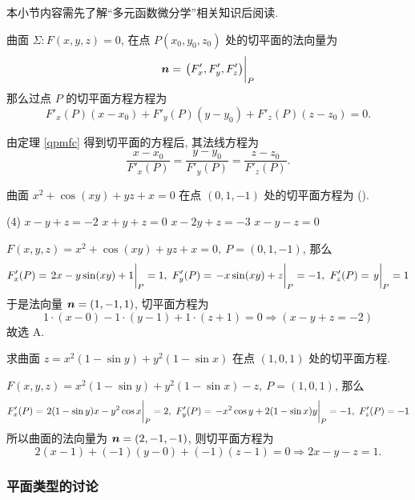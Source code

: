 本小节内容需先了解“多元函数微分学”相关知识后阅读.

\begin{theorem}[切平面方程]
    曲面 $\varSigma:F(x,y,z)=0$, 在点 $P(x_0,y_0,z_0)$ 处的切平面的法向量为
    \label{qpmfc}
    $$\vb*{n}=\eval{\qty(F'_x,F'_y,F'_z)}_{P}$$
    那么过点 $P$ 的切平面方程方程为
    $$F'_x(P)(x-x_0)+F'_y(P)(y-y_0)+F'_z(P)(z-z_0)=0.$$
\end{theorem}

\begin{theorem}[法线方程]
    由定理 \ref{qpmfc} 得到切平面的方程后, 其法线方程为 $$\dfrac{x-x_0}{F'_x(P)}=\dfrac{y-y_0}{F'_y(P)}=\dfrac{z-z_0}{F'_z(P)}.$$
\end{theorem}

\begin{example}[2013 数一]
    曲面 $x^2+\cos(xy)+yz+x=0$ 在点 $(0,1,-1)$ 处的切平面方程为 (\quad).
    \begin{tasks}(4)
        \task $x-y+z=-2$
        \task $x+y+z=0$
        \task $x-2y+z=-3$
        \task $x-y-z=0$
    \end{tasks}
\end{example}
\begin{solution}
    $F(x,y,z)=x^2+\cos(xy)+yz+x=0,~P=(0,1,-1)$, 那么
    $$F'_x(P)=\eval{2x-y\sin(xy)+1}_{P}=1,~F'_y(P)=\eval{-x\sin(xy)+z}_{P}=-1,~F'_z(P)=\eval{y}_{P}=1$$
    于是法向量 $\vb*{n}=(1,-1,1)$, 切平面方程为 $$1\cdot(x-0)-1\cdot(y-1)+1\cdot(z+1)=0\Rightarrow(x-y+z=-2)$$
    故选 A.
\end{solution}

\begin{example}[2014 数一]
    求曲面 $z=x^2(1-\sin y)+y^2(1-\sin x)$ 在点 $(1,0,1)$ 处的切平面方程.
\end{example}
\begin{solution}
    $F(x,y,z)=x^2(1-\sin y)+y^2(1-\sin x)-z,~P=(1,0,1)$, 那么
    $$F'_x(P)=\eval{2(1-\sin y)x-y^2\cos x}_{P}=2,~F'_y(P)=\eval{-x^2\cos y+2(1-\sin x)y}_{P}=-1,~F'_z(P)=-1$$
    所以曲面的法向量为 $\vb*{n}=(2,-1,-1)$, 则切平面方程为 $$2(x-1)+(-1)(y-0)+(-1)(z-1)=0\Rightarrow 2x-y-z=1.$$
\end{solution}

\subsubsection{平面类型的讨论}

